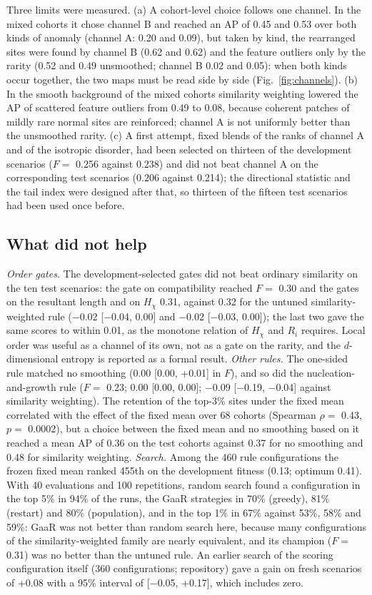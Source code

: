 \documentclass[final,5p,times,twocolumn,authoryear]{elsarticle}
\begin{document}
Three limits were measured. (a) A cohort-level choice follows one channel. In the mixed cohorts it chose channel B and reached an AP of 0.45 and 0.53 over both kinds of anomaly (channel A: 0.20 and 0.09), but taken by kind, the rearranged sites were found by channel B (0.62 and 0.62) and the feature outliers only by the rarity (0.52 and 0.49 unsmoothed; channel B 0.02 and 0.05): when both kinds occur together, the two maps must be read side by side (Fig.~\ref{fig:channels}). (b) In the smooth background of the mixed cohorts similarity weighting lowered the AP of scattered feature outliers from 0.49 to 0.08, because coherent patches of mildly rare normal sites are reinforced; channel A is not uniformly better than the unsmoothed rarity. (c) A first attempt, fixed blends of the ranks of channel A and of the isotropic disorder, had been selected on thirteen of the development scenarios ($F=$ 0.256 against 0.238) and did not beat channel A on the corresponding test scenarios (0.206 against 0.214); the directional statistic and the tail index were designed after that, so thirteen of the fifteen test scenarios had been used once before.

\subsection{What did not help}
\label{sec:neg}
\emph{Order gates.} The development-selected gates did not beat ordinary similarity on the ten test scenarios: the gate on compatibility reached $F=$ 0.30 and the gates on the resultant length and on $H_\chi$ 0.31, against 0.32 for the untuned similarity-weighted rule ($-$0.02 [$-$0.04, 0.00] and $-$0.02 [$-$0.03, 0.00]); the last two gave the same scores to within 0.01, as the monotone relation of $H_\chi$ and $R_i$ requires. Local order was useful as a channel of its own, not as a gate on the rarity, and the $d$-dimensional entropy is reported as a formal result. \emph{Other rules.} The one-sided rule matched no smoothing (0.00 [0.00, +0.01] in $F$), and so did the nucleation-and-growth rule ($F=$ 0.23; 0.00 [0.00, 0.00]; $-$0.09 [$-$0.19, $-$0.04] against similarity weighting). The retention of the top-3\% sites under the fixed mean correlated with the effect of the fixed mean over 68 cohorts (Spearman $\rho=$ 0.43, $p=$ 0.0002), but a choice between the fixed mean and no smoothing based on it reached a mean AP of 0.36 on the test cohorts against 0.37 for no smoothing and 0.48 for similarity weighting. \emph{Search.} Among the 460 rule configurations the frozen fixed mean ranked 455th on the development fitness (0.13; optimum 0.41). With 40 evaluations and 100 repetitions, random search found a configuration in the top 5\% in 94\% of the runs, the GaaR strategies in 70\% (greedy), 81\% (restart) and 80\% (population), and in the top 1\% in 67\% against 53\%, 58\% and 59\%: GaaR was not better than random search here, because many configurations of the similarity-weighted family are nearly equivalent, and its champion ($F=$ 0.31) was no better than the untuned rule. An earlier search of the scoring configuration itself (360 configurations; repository) gave a gain on fresh scenarios of +0.08 with a 95\% interval of [$-$0.05, +0.17], which includes zero.
\end{document}
